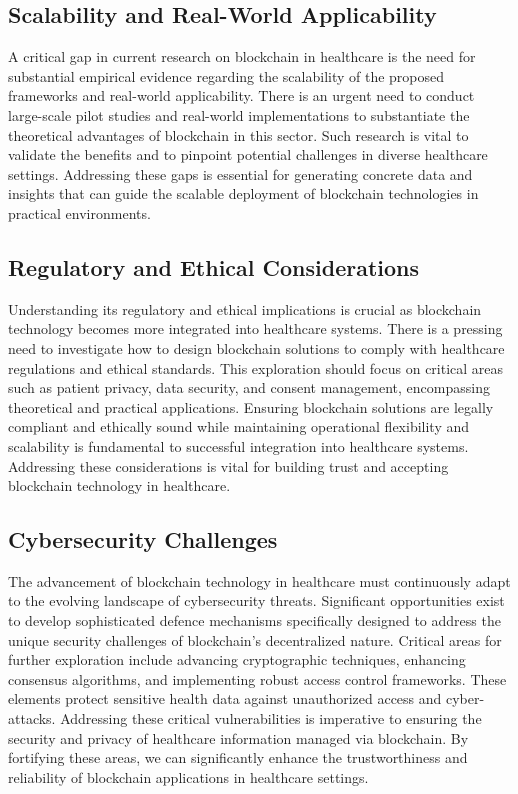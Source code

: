 \documentclass[cic,tc,english]{iiufrgs}
\begin{document}
        \subsection{Scalability and Real-World Applicability} 
            A critical gap in current research on blockchain in healthcare is the need for substantial empirical evidence regarding the scalability of the proposed frameworks and real-world applicability. There is an urgent need to conduct large-scale pilot studies and real-world implementations to substantiate the theoretical advantages of blockchain in this sector. Such research is vital to validate the benefits and to pinpoint potential challenges in diverse healthcare settings. Addressing these gaps is essential for generating concrete data and insights that can guide the scalable deployment of blockchain technologies in practical environments.

        \subsection{Regulatory and Ethical Considerations} 
            Understanding its regulatory and ethical implications is crucial as blockchain technology becomes more integrated into healthcare systems. There is a pressing need to investigate how to design blockchain solutions to comply with healthcare regulations and ethical standards. This exploration should focus on critical areas such as patient privacy, data security, and consent management, encompassing theoretical and practical applications. Ensuring blockchain solutions are legally compliant and ethically sound while maintaining operational flexibility and scalability is fundamental to successful integration into healthcare systems. Addressing these considerations is vital for building trust and accepting blockchain technology in healthcare.

        \subsection{Cybersecurity Challenges} 
            The advancement of blockchain technology in healthcare must continuously adapt to the evolving landscape of cybersecurity threats. Significant opportunities exist to develop sophisticated defence mechanisms specifically designed to address the unique security challenges of blockchain's decentralized nature. Critical areas for further exploration include advancing cryptographic techniques, enhancing consensus algorithms, and implementing robust access control frameworks. These elements protect sensitive health data against unauthorized access and cyber-attacks. Addressing these critical vulnerabilities is imperative to ensuring the security and privacy of healthcare information managed via blockchain. By fortifying these areas, we can significantly enhance the trustworthiness and reliability of blockchain applications in healthcare settings.
\end{document}
